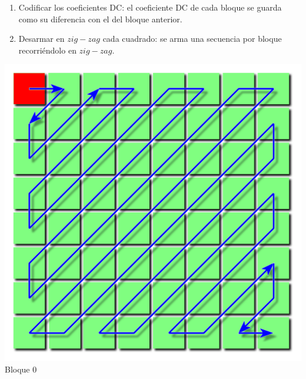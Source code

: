 \documentclass{beamer}
\begin{document}
\begin{frame}
    \begin{enumerate}
        \item Codificar los coeficientes DC: el coeficiente DC de cada bloque se guarda como su diferencia con el del bloque anterior.
        \item Desarmar en $zig-zag$ cada cuadrado: se arma una secuencia por bloque recorriéndolo en $zig-zag$.
    \end{enumerate}
    \vfill
    \begin{minipage}[t]{0.3\linewidth}
        \begin{center}
        \includegraphics[scale=0.10]{fig/zigzag_dc.png}\\
        \small Bloque 0
        \end{center}
    \end{minipage}
    \hfill
    \begin{minipage}[t]{0.3\linewidth}
        \begin{center}

\end{center}
\end{minipage}
\end{frame}
\end{document}
